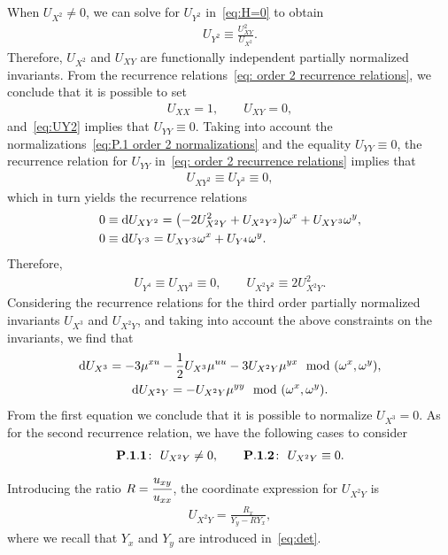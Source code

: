 \documentclass[pdftex]{sigma}%
\numberwithin{equation}{section}
\begin{document}
When $U_{X^2}\neq 0$, we can solve for $U_{Y^2}$ in~\eqref{eq:H=0} to obtain
%
\begin{gather}\label{eq:UY2}
U_{Y^2} \equiv \frac{U_{XY}^2}{U_{X^2}}.
\end{gather}
%
Therefore, $U_{X^2}$ and $U_{XY}$ are functionally independent partially normalized invariants. From the recurrence relations~\eqref{eq: order 2 recurrence relations}, we conclude that it is possible to set
%
\begin{gather}\label{eq:P.1 order 2 normalizations}
U_{XX}=1,\qquad U_{XY}=0,
\end{gather}
%
and~\eqref{eq:UY2} implies that $U_{YY} \equiv 0$. Taking into account the normalizations~\eqref{eq:P.1 order 2 normalizations} and the equality $U_{YY}\equiv 0$, the recurrence relation for $U_{YY}$ in~\eqref{eq: order 2 recurrence relations} implies that
%
\begin{gather}\label{eq:P.1 order 3 constraints}
U_{XY^2} \equiv U_{Y^3} \equiv 0,
\end{gather}
%
which in turn yields the recurrence relations
%
\begin{align*}
0 &\equiv {\rm d}U_{XY^2} = \big({-}2U_{X^2Y}^2 + U_{X^2Y^2}\big)\omega^x + U_{XY^3}\omega^y,\\
0 &\equiv {\rm d}U_{Y^3} = U_{XY^3}\omega^x + U_{Y^4}\omega^y.
\end{align*}
%
Therefore,
%
\begin{gather}\label{eq:order 4 constraints}
U_{Y^4}\equiv U_{XY^3}\equiv 0,\qquad U_{X^2Y^2}\equiv 2U_{X^2Y}^2.
\end{gather}
%
Considering the recurrence relations for the third order partially normalized invariants $U_{X^3}$ and $U_{X^2Y}$, and taking into account the above constraints on the invariants, we find that
\begin{gather*}
{\rm d}U_{X^3} = - 3\mu^{xu} - \frac{1}{2}U_{X^3}\mu^{uu}-3U_{X^2Y}\mu^{yx} \mod(\omega^x,\omega^y),
\\
{\rm d}U_{X^2Y} = -U_{X^2Y}\mu^{yy} \mod(\omega^x,\omega^y).
\end{gather*}
%
From the first equation we conclude that it is possible to normalize $U_{X^3}=0$. As for the second recurrence relation, we have the following cases to consider
%
\begin{gather*}
{\bf P.1.1}\colon\ U_{X^2Y}\neq 0,\qquad
{\bf P.1.2}\colon\ U_{X^2Y}\equiv 0.
\end{gather*}
Introducing the ratio $R= \cfrac{u_{xy}}{u_{xx}}$, the coordinate expression for $U_{X^2Y}$ is
\begin{gather*}
U_{X^2Y} = \frac{R_x}{Y_y-RY_x},
\end{gather*}
where we recall that $Y_x$ and $Y_y$ are introduced in~\eqref{eq:det}.
\end{document}
